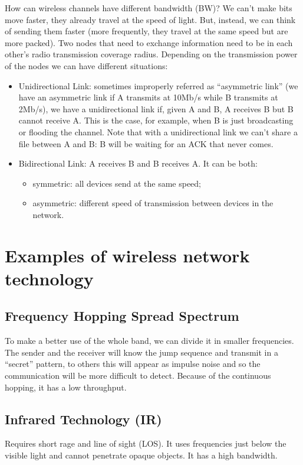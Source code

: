 How can wireless channels have different bandwidth (BW)? We can't make 
bits move faster, they already travel at the speed of light. But, instead, we 
can think of sending them faster (more frequently, they travel at the same 
speed but are more packed).
Two nodes that need to exchange information need to be in each other's 
radio transmission coverage radius. Depending on the transmission power of the 
nodes we can have different situations:
\begin{itemize}
\item Unidirectional Link: sometimes improperly referred as 
  ``asymmetric link'' (we have an asymmetric link if A transmits at 10Mb/s while
  B transmits at 2Mb/s), we have a unidirectional link if, given A and B, A
  receives B but B cannot receive A. This is the case, for example, when B is
  just broadcasting or flooding the channel. Note that with a unidirectional
  link we can't share a file between A and B: B will be waiting for an ACK that
  never comes.
\item Bidirectional Link: A receives B and B receives A. It can be both:
 \begin{itemize}
 	\item symmetric: all devices send at the same speed;
 	\item asymmetric: different speed of transmission between devices in the
  network.
 \end{itemize}
\end{itemize}

\section{Examples of wireless network technology}

\subsection{Frequency Hopping Spread Spectrum}
To make a better use of the whole band, we can divide it in smaller frequencies.
The sender and the receiver will know the jump sequence and transmit in a
``secret'' pattern, to others this will appear as impulse noise and so the
communication will be more difficult to detect. Because of the continuous
hopping, it has a low throughput.

\subsection{Infrared Technology (IR)}
Requires short rage and line of 
sight (LOS). It uses frequencies just below the visible light and cannot 
penetrate opaque objects. It has a high bandwidth.

